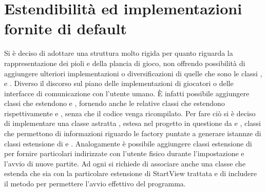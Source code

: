 \documentclass[letterpaper,10pt,italian,openany,oneside]{sphinxmanual}
\begin{document}
\section{Estendibilità ed implementazioni fornite di default}
\label{\detokenize{introduzione:estendibilita-ed-implementazioni-fornite-di-default}}
Si è deciso di adottare una struttura molto rigida per quanto riguarda la rappresentazione dei pioli e della plancia
di gioco, non offrendo possibilità di aggiungere ulteriori implementazioni o diversificazioni di quelle che sono le classi
,  e .
Diverso il discorso sul piano delle implementazioni di giocatori o delle interfacce di comunicazione con l’utente umano.
È infatti possibile aggiungere classi che estendono  e , fornendo anche le relative classi  che estendono
rispettivamente  e , senza che il codice venga ricompilato.
Per fare ciò si è deciso di implementare una classe astratta , estesa nel progetto in questione
da  e , classi che permettono di  informazioni
riguardo le factory puntate a generare istannze di classi estensione di  e .
Analogamente è possibile aggiungere classi estensione di  per fornire particolari  indirizzate 
con l’utente fisico durante l’impostazione e l’avvio di nuove partite. Ad ogni  si richiede di associare anche una classe
che estenda  che sia  con la particolare estensione di StartView trattata e di includere il metodo  per permettere
l’avvio effettivo del programma.
\end{document}
